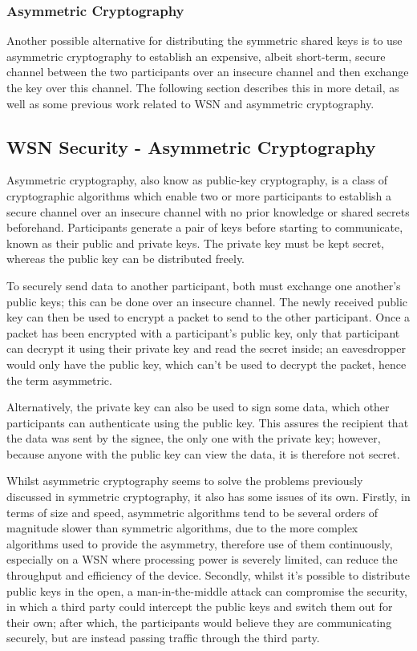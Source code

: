 \documentclass{mprop}
\begin{document}
\subsubsection{Asymmetric Cryptography} %
\label{ssub:asymmetric_cryptography}
Another possible alternative for distributing the symmetric shared keys is to use asymmetric cryptography to establish an expensive, albeit short-term, secure channel between the two participants over an insecure channel and then exchange the key over this channel. The following section describes this in more detail, as well as some previous work related to WSN and asymmetric cryptography.

\subsection{WSN Security - Asymmetric Cryptography} %
\label{sub:asymmetric_security}
Asymmetric cryptography, also know as public-key cryptography, is a class of cryptographic algorithms which enable two or more participants to establish a secure channel over an insecure channel with no prior knowledge or shared secrets beforehand. Participants generate a pair of keys before starting to communicate, known as their public and private keys. The private key must be kept secret, whereas the public key can be distributed freely. 

To securely send data to another participant, both must exchange one another's public keys; this can be done over an insecure channel. The newly received public key can then be used to encrypt a packet to send to the other participant. Once a packet has been encrypted with a participant's public key, only that participant can decrypt it using their private key and read the secret inside; an eavesdropper would only have the public key, which can't be used to decrypt the packet, hence the term asymmetric. 

Alternatively, the private key can also be used to sign some data, which other participants can authenticate using the public key. This assures the recipient that the data was sent by the signee, the only one with the private key; however, because anyone with the public key can view the data, it is therefore not secret.

Whilst asymmetric cryptography seems to solve the problems previously discussed in symmetric cryptography, it also has some issues of its own. Firstly, in terms of size and speed, asymmetric algorithms tend to be several orders of magnitude slower than symmetric algorithms, due to the more complex algorithms used to provide the asymmetry, therefore use of them continuously, especially on a WSN where processing power is severely limited, can reduce the throughput and efficiency of the device.
Secondly, whilst it's possible to distribute public keys in the open, a man-in-the-middle attack can compromise the security, in which a third party could intercept the public keys and switch them out for their own; after which, the participants would believe they are communicating securely, but are instead passing traffic through the third party.
\end{document}
